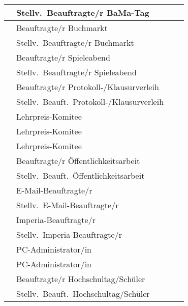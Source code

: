\documentclass[sitzung=fsv-konstituierend,entwurf]{fsphys-protokoll}
\begin{document}
\begin{longtable}{| r @{ } l | l | c |}
	\fsrnum & Stellv.\ Beauftragte/r BaMa-Tag
		& &
	\\ \hline
	\fsrnum & Beauftragte/r Buchmarkt
		& &
	\\ \hline
	\fsrnum & Stellv.\ Beauftragte/r Buchmarkt
		& &
	\\ \hline
	\fsrnum & Beauftragte/r Spieleabend
		& &
	\\ \hline
	\fsrnum & Stellv.\ Beauftragte/r Spieleabend
		& &
	\\ \hline
	\fsrnum & Beauftragte/r Protokoll-/Klausurverleih
		& &
	\\ \hline
	\fsrnum & Stellv.\ Beauft.\ Protokoll-/Klausurverleih
		& &
	\\ \hline
	\fsrnum & Lehrpreis-Komitee
		& &
	\\ \hline
	\fsrnum & Lehrpreis-Komitee
		& &
	\\ \hline
	\fsrnum & Lehrpreis-Komitee
		& &
	\\ \hline
	\fsrnum & Beauftragte/r Öffentlichkeitsarbeit
		& &
	\\ \hline
	\fsrnum & Stellv.\ Beauft.\ Öffentlichkeitsarbeit
		& &
	\\ \hline
	\fsrnum & E-Mail-Beauftragte/r
		& &
	\\ \hline
	\fsrnum & Stellv.\ E-Mail-Beauftragte/r
		& &
	\\ \hline
	\fsrnum & Imperia-Beauftragte/r
		& &
	\\ \hline
	\fsrnum & Stellv.\ Imperia-Beauftragte/r
		& &
	\\ \hline
	\fsrnum & PC-Administrator/in
		& &
	\\ \hline
	\fsrnum & PC-Administrator/in
		& &
	\\ \hline
	\fsrnum & Beauftragte/r Hochschultag/Schüler
		& &
	\\ \hline
	\fsrnum & Stellv.\ Beauft.\ Hochschultag/Schüler
		& &
	\\ \hline
\end{longtable}

\clearpage

\appendix
\end{document}
